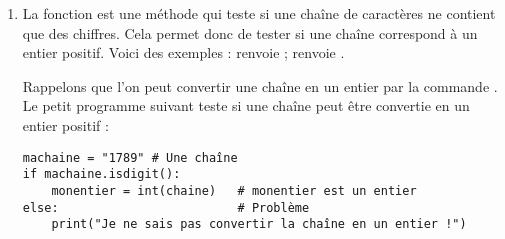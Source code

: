 \documentclass[11pt,class=report,crop=false]{standalone}
\begin{document}
\begin{cours}
\begin{enumerate}
  \item  La fonction  est une méthode \Python{} qui teste si une chaîne de caractères ne contient que des chiffres. Cela permet donc de tester si une chaîne correspond à un entier positif.
 Voici des exemples :  renvoie  ;   renvoie .
 
 Rappelons que l'on peut convertir une chaîne en un entier par la commande . Le petit programme suivant teste si une chaîne peut être convertie en un entier positif :
 
\begin{lstlisting}
machaine = "1789" # Une chaîne
if machaine.isdigit():
    monentier = int(chaine)   # monentier est un entier
else:                         # Problème
    print("Je ne sais pas convertir la chaîne en un entier !")
\end{lstlisting} 

\end{enumerate}  
\end{cours}

\end{document}
